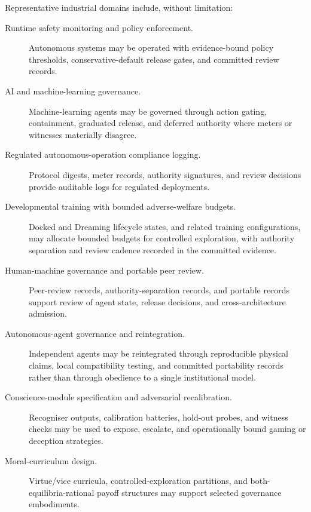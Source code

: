 \documentclass[a4paper,12pt]{article}
\begin{document}
Representative industrial domains include, without limitation:

\begin{description}
  \item[Runtime safety monitoring and policy enforcement.]
  Autonomous systems may be operated with evidence-bound policy
  thresholds, conservative-default release gates, and committed
  review records.

  \item[AI and machine-learning governance.]
  Machine-learning agents may be governed through action gating,
  containment, graduated release, and deferred authority where
  meters or witnesses materially disagree.

  \item[Regulated autonomous-operation compliance logging.]
  Protocol digests, meter records, authority signatures, and review
  decisions provide auditable logs for regulated deployments.

  \item[Developmental training with bounded adverse-welfare budgets.]
  Docked and Dreaming lifecycle states, and related training
  configurations, may allocate bounded
  budgets for controlled exploration, with authority separation and
  review cadence recorded in the committed evidence.

  \item[Human-machine governance and portable peer review.]
  Peer-review records, authority-separation records, and portable
  records support review of agent state, release decisions, and
  cross-architecture admission.

  \item[Autonomous-agent governance and reintegration.]
  Independent agents may be reintegrated through reproducible
  physical claims, local compatibility testing, and committed
  portability records rather than through obedience to a single
  institutional model.

  \item[Conscience-module specification and adversarial
  recalibration.]
  Recogniser outputs, calibration batteries, hold-out probes, and
  witness checks may be used to expose, escalate, and operationally
  bound gaming or deception strategies.

  \item[Moral-curriculum design.]
  Virtue/vice curricula, controlled-exploration partitions, and
  both-equilibria-rational payoff structures may support selected
  governance embodiments.


\end{description}
\end{document}
